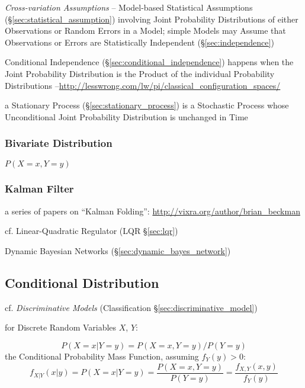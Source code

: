 \asterism

\fist \emph{Cross-variation Assumptions} -- Model-based Statistical Assumptions
(\S\ref{sec:statistical_assumption}) involving Joint Probability Distributions
of either Observations or Random Errors in a Model; simple Models may Assume
that Observations or Errors are Statistically Independent
(\S\ref{sec:independence})

Conditional Independence (\S\ref{sec:conditional_independence}) happens when
the Joint Probability Distribution is the Product of the individual Probability
Distributions
--\url{http://lesswrong.com/lw/pi/classical_configuration_spaces/}

\fist a Stationary Process (\S\ref{sec:stationary_process}) is a Stochastic
Process whose Unconditional Joint Probability Distribution is unchanged in Time



\subsubsection{Bivariate Distribution}\label{sec:bivariate_distribution}

$P(X = x, Y = y)$



\subsubsection{Kalman Filter}\label{sec:kalman_filter}

a series of papers on ``Kalman Folding'':
\url{http://vixra.org/author/brian_beckman}

cf. Linear-Quadratic Regulator (LQR \S\ref{sec:lqr})

\fist Dynamic Bayesian Networks (\S\ref{sec:dynamic_bayes_network})



\subsection{Conditional Distribution}\label{sec:conditional_distribution}

cf. \emph{Discriminative Models} (Classification
\S\ref{sec:discriminative_model})

for Discrete Random Variables $X$, $Y$:

\[
  P(X = x | Y = y) = P(X = x, Y = y)/P(Y = y)
\]
the Conditional Probability Mass Function, assuming $f_Y(y) > 0$:
\[
  f_{X|Y}(x|y) = P(X = x|Y = y) =
    \frac{P(X = x, Y = y)}{P(Y = y)} =
    \frac{f_{X,Y}(x,y)}{f_Y(y)}
\]

